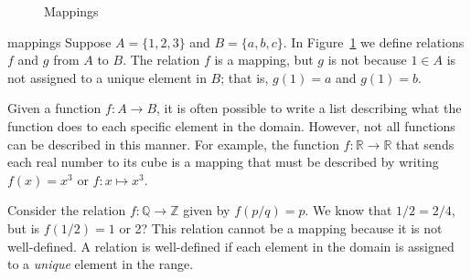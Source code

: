 \begin{figure}[htb] %

\begin{center}

\caption{Mappings} \label{sets_figure_mappings} 

\end{center}
\end{figure}

\begin{example}{mappings}
Suppose $A = \{1, 2, 3 \}$ and $B = \{a, b, c \}$.  In Figure~\ref{sets_figure_mappings} we define relations $f$ and  $g$ from $A$ to $B$.  The relation $f$ is a mapping, but $g$ is not because $1 \in A$ is not assigned to a unique element in $B$; that is, $g(1) = a$ and $g(1) = b$.  
\end{example}

Given a function $f : A \rightarrow B$, it is often possible to write a list describing what the function does to each specific element in the domain.  However, not all functions can be described in this manner.  For example, the function $f: {\mathbb R} \rightarrow {\mathbb R}$ that sends each real number to its cube is a mapping that must be described by writing $f(x) = x^3$ or $f:x \mapsto x^3$. 
 
Consider the relation $f : {\mathbb Q} \rightarrow {\mathbb Z}$ given by $f(p/q) = p$.  We know that $1/2 = 2/4$, but is $f(1/2) = 1$ or 2?  This relation cannot be a mapping because it is not well-defined.  A relation is {\bfi well-defined\/} if each element in the domain is assigned to a {\em unique\/} element in the range. 

